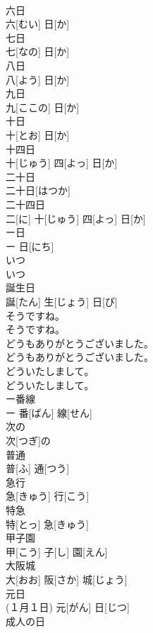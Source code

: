 \documentclass[8pt]{extreport}
\begin{document}
\begin{CJK}{UTF8}{min}
\\	六日	
\\	六[むい] 日[か]		
\\	七日	
\\	七[なの] 日[か]		
\\	八日	
\\	八[よう] 日[か]		
\\	九日	
\\	九[ここの] 日[か]		
\\	十日	
\\	十[とお] 日[か]		
\\	十四日	
\\	十[じゅう] 四[よっ] 日[か]		
\\	二十日	
\\	二十日[はつか]		
\\	二十四日	
\\	二[に] 十[じゅう] 四[よっ] 日[か]		
\\	ー日	
\\	ー 日[にち]		
\\	いつ	
\\	いつ		
\\	誕生日	
\\	誕[たん] 生[じょう] 日[び]		
\\	そうですね。	
\\	そうですね。		
\\	どうもありがとうございました。	
\\	どうもありがとうございました。		
\\	どういたしまして。	
\\	どういたしまして。		
\\	ー番線	
\\	ー 番[ばん] 線[せん]		
\\	次の	
\\	次[つぎ]の		
\\	普通	
\\	普[ふ] 通[つう]		
\\	急行	
\\	急[きゅう] 行[こう]		
\\	特急	
\\	特[とっ] 急[きゅう]		
\\	甲子園	
\\	甲[こう] 子[し] 園[えん]		
\\	大阪城	
\\	大[おお] 阪[さか] 城[じょう]		
\\	元日	
\\	(１月１日)	元[がん] 日[じつ]		
\\	成人の日	

\end{CJK}
\end{document}
